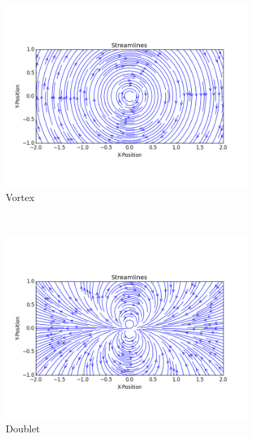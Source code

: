 \documentclass[10pt,a4paper]{article}
\begin{document}
\begin{figure}
\begin{subfigure}{0.32\textwidth}
    \includegraphics[width=1.0\textwidth]{Figures/Vortex}
  \caption{Vortex}\label{F_vortex}
\end{subfigure}
\\
\centering
\begin{subfigure}{0.32\textwidth}
    \includegraphics[width=1.0\textwidth]{Figures/Doublet}
  \caption{Doublet}\label{F_doublet}
\end{subfigure}
\begin{subfigure}{0.32\textwidth}

\end{subfigure}
\end{figure}
\end{document}
